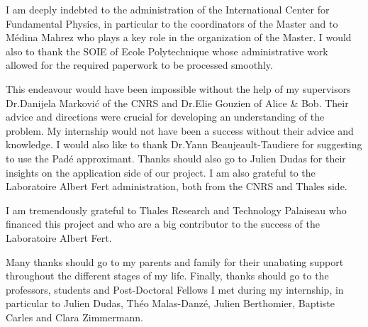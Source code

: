 I am deeply indebted to the administration of the International Center for Fundamental Physics, in particular to the coordinators of the Master and to Médina Mahrez who plays a key role in the organization of the Master.  I would also to thank the SOIE of Ecole Polytechnique whose administrative work allowed for the required paperwork to be processed smoothly.

This endeavour would have been impossible without the help of my supervisors Dr.\@ Danijela Marković of the CNRS and Dr.\@ Elie Gouzien of Alice \& Bob. Their advice and directions were crucial for developing an understanding of the problem. My internship would not have been a success without their advice and knowledge. I would also like to thank Dr.\@ Yann Beaujeault-Taudiere for suggesting to use the Padé approximant. Thanks should also go to Julien Dudas for their insights on the application side of our project. I am also grateful to the Laboratoire Albert Fert administration, both from the CNRS and Thales side.

I am tremendously grateful to Thales Research and Technology Palaiseau who financed this project and who are a big contributor to the success of the Laboratoire Albert Fert.

Many thanks should go to my parents and family for their unabating support throughout the different stages of my life. Finally, thanks should go to the professors, students and Post-Doctoral Fellows I met during my internship, in particular to Julien Dudas, Théo Malas-Danzé, Julien Berthomier, Baptiste Carles and Clara Zimmermann.